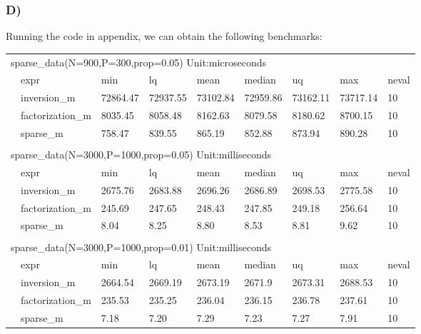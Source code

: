 \documentclass{article}
\begin{document}
\subsubsection*{D)}

Running the code in appendix, we can obtain the following benchmarks:\\

\begin{tabular}{lllllllll}
\multicolumn{8}{l}{sparse\_data(N=900,P=300,prop=0.05) Unit:microseconds}       &       \\
 & expr             & min        & lq         & mean       & median   & uq      & max     & neval \\
 & inversion\_m     & 72864.47   & 72937.55   & 73102.84   & 72959.86 & 73162.11   & 73717.14   & 10    \\
 & factorization\_m & 8035.45    & 8058.48    & 8162.63    & 8079.58  & 8180.62    & 8700.15    & 10    \\
 & sparse\_m        & 758.47     & 839.55     & 865.19    & 852.88    & 873.94   & 890.28   & 10    \\
 &                  &         &         &         &         &         &         &       \\
\multicolumn{9}{l}{sparse\_data(N=3000,P=1000,prop=0.05) Unit:milliseconds}             \\
 & expr             & min     & lq      & mean    & median  & uq      & max     & neval \\
 & inversion\_m     & 2675.76 & 2683.88 & 2696.26 & 2686.89  & 2698.53 & 2775.58 & 10    \\
 & factorization\_m & 245.69  & 247.65  & 248.43  & 247.85  & 249.18  & 256.64  & 10    \\
 & sparse\_m        & 8.04 & 8.25 & 8.80 & 8.53 & 8.81 & 9.62 & 10    \\
 &                  &         &         &         &         &         &         &       \\
\multicolumn{9}{l}{sparse\_data(N=3000,P=1000,prop=0.01) Unit:milliseconds}             \\
 & expr             & min     & lq      & mean    & median  & uq      & max     & neval \\
 & inversion\_m     & 2664.54 & 2669.19 & 2673.19 & 2671.9  & 2673.31 & 2688.53 & 10    \\
 & factorization\_m & 235.53  & 235.25  & 236.04  & 236.15  & 236.78  & 237.61  & 10    \\
 & sparse\_m        & 7.18 & 7.20 & 7.29 & 7.23 & 7.27 & 7.91 & 10   
\end{tabular}
\end{document}
